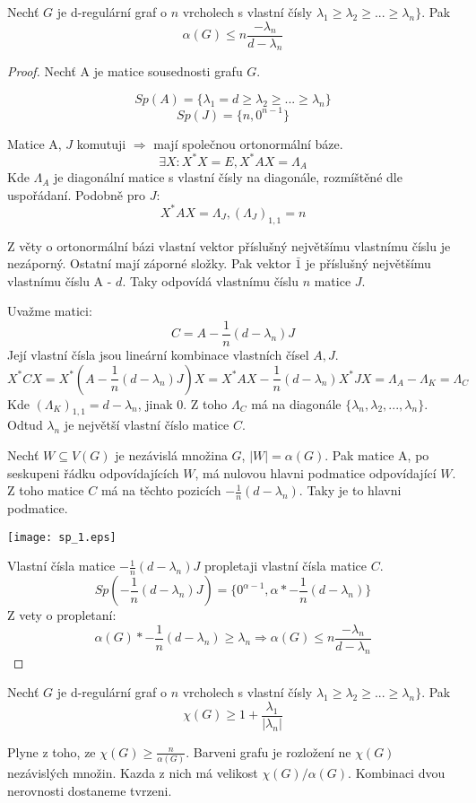 \begin{theorem}
	Nechť $G$ je d-regulární graf o $n$ vrcholech s vlastní čísly $\lambda_1 \geq \lambda_2 \geq ... \geq \lambda_n \}$. Pak
	\[ \alpha(G) \leq n \frac{-\lambda_n}{d - \lambda_n} \]
\end{theorem}
\begin{proof}
	Nechť A je matice sousednosti grafu $G$.

	\[ Sp(A) = \{\lambda_1 = d \geq \lambda_2 \geq ... \geq \lambda_n \} \]
	\[ Sp(J) = \{n, 0^{n-1} \} \]

	Matice A, $J$ komutuji $\Rightarrow$ mají společnou ortonormální báze.
	\[ \exists X: X^{\ast}X = E, X^{\ast}AX = \Lambda_A \]
	Kde $\Lambda_A$ je diagonální matice s vlastní čísly na diagonále, rozmíštěné dle uspořádaní.
	Podobně pro $J$:
	\[ X^{\ast}AX = \Lambda_J, (\Lambda_J)_{1,1} = n \]

	Z věty o ortonormální bázi vlastní vektor příslušný největšímu vlastnímu číslu je nezáporný. Ostatní mají záporné složky.
	Pak vektor $\bar{1}$ je příslušný největšímu vlastnímu číslu A - $d$.
	Taky odpovídá vlastnímu číslu $n$ matice $J$.

 	Uvažme matici:
	\[ C = A - \frac{1}{n}(d - \lambda_n)J \]
	Její vlastní čísla jsou lineární kombinace vlastních čísel $A, J$.
	\[ X^{\ast}CX = X^{\ast}(A - \frac{1}{n}(d - \lambda_n)J)X = X^{\ast}AX - \frac{1}{n}(d - \lambda_n)X^{\ast}JX = \Lambda_A - \Lambda_K = \Lambda_C \]
	Kde $(\Lambda_K)_{1,1} = d - \lambda_n$, jinak 0. Z toho $\Lambda_C$ má na diagonále $\{ \lambda_n, \lambda_2,..., \lambda_n \}$.
	Odtud $\lambda_n$ je největší vlastní číslo matice $C$.

	Nechť $W \subseteq V(G)$ je nezávislá množina $G$, $|W| = \alpha(G)$. Pak matice A, po seskupeni řádku odpovídajících $W$, má nulovou hlavni podmatice odpovídající $W$.
	Z toho matice $C$ má na těchto pozicích $-\frac{1}{n}(d - \lambda_n)$. Taky je to hlavni podmatice.

	\texttt{[image: sp\_1.eps]}

	Vlastní čísla matice $-\frac{1}{n}(d - \lambda_n)J$ propletaji vlastní čísla matice $C$.
	\[ Sp\left(-\frac{1}{n}(d - \lambda_n)J\right) = \{0^{\alpha - 1}, \alpha * -\frac{1}{n}(d - \lambda_n) \} \]
	Z vety o propletaní:
	\[ \alpha(G) * -\frac{1}{n}(d - \lambda_n) \geq \lambda_n \Rightarrow \alpha(G) \leq n \frac{-\lambda_n}{d - \lambda_n} \]
\end{proof}

\begin{consequence}
	Nechť $G$ je d-regulární graf o $n$ vrcholech s vlastní čísly $\lambda_1 \geq \lambda_2 \geq ... \geq \lambda_n \}$. Pak
	\[ \chi(G) \geq 1 + \frac{\lambda_1}{|\lambda_n|} \]

	Plyne z toho, ze $ \chi(G) \geq \frac{n}{\alpha(G)}$. Barveni grafu je rozložení ne $\chi(G)$ nezávislých množin. Kazda z nich má velikost $\chi(G)/\alpha(G)$. Kombinaci dvou nerovnosti dostaneme tvrzeni.
\end{consequence}

